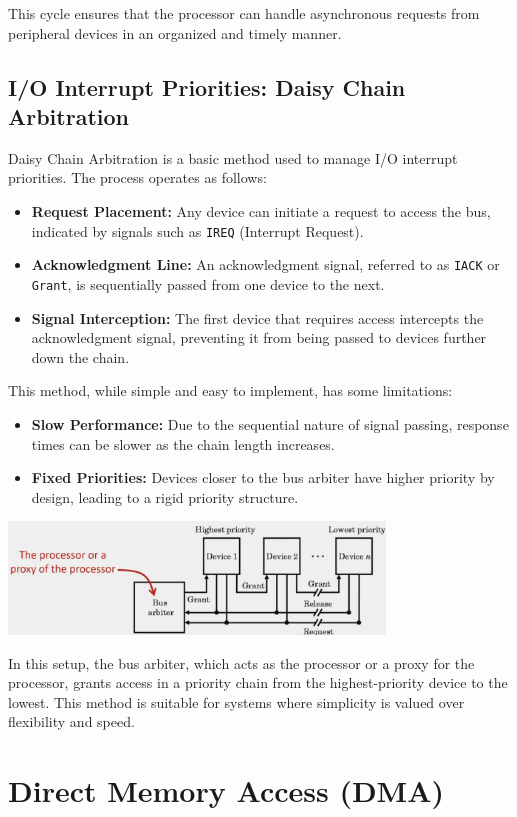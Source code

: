 This cycle ensures that the processor can handle asynchronous requests from peripheral devices in an organized and timely manner.
\newpage
\subsection{I/O Interrupt Priorities: Daisy Chain Arbitration}

Daisy Chain Arbitration is a basic method used to manage I/O interrupt priorities. The process operates as follows:

\begin{itemize}
    \item \textbf{Request Placement:} Any device can initiate a request to access the bus, indicated by signals such as \texttt{IREQ} (Interrupt Request).
    \item \textbf{Acknowledgment Line:} An acknowledgment signal, referred to as \texttt{IACK} or \texttt{Grant}, is sequentially passed from one device to the next.
    \item \textbf{Signal Interception:} The first device that requires access intercepts the acknowledgment signal, preventing it from being passed to devices further down the chain.
\end{itemize}

This method, while simple and easy to implement, has some limitations:
\begin{itemize}
    \item \textbf{Slow Performance:} Due to the sequential nature of signal passing, response times can be slower as the chain length increases.
    \item \textbf{Fixed Priorities:} Devices closer to the bus arbiter have higher priority by design, leading to a rigid priority structure.
\end{itemize}

\begin{center}
    \includegraphics[width=0.75\textwidth]{chapters/chapter2c/images/bus_arbiter.png}
\end{center}

In this setup, the bus arbiter, which acts as the processor or a proxy for the processor, grants access in a priority chain from the highest-priority device to the lowest. This method is suitable for systems where simplicity is valued over flexibility and speed.

\section{Direct Memory Access (DMA)}
